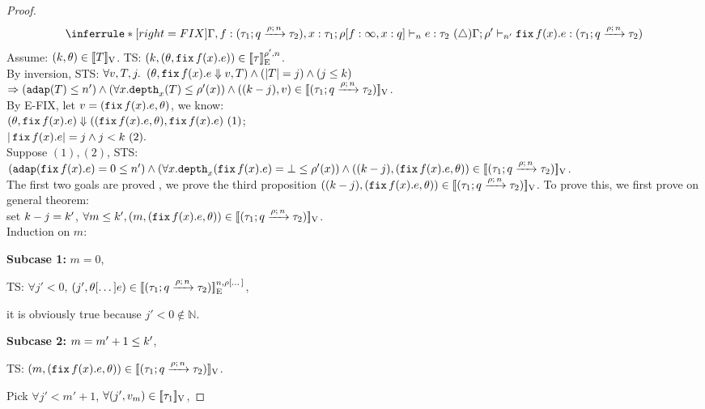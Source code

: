 \documentclass[a4paper,11pt]{article}
\theoremstyle{definition}
\begin{document}
\begin{proof}
\[
    \inferrule*[right = FIX]{
      \Gamma, f: (\tarr{\type_1}{\type_2}{\nnatbiA}{\dmap}{\nnatA}), x: \type_1;
      \dmap[f: \infty, x: \nnatbiA]
      \tvdash{\nnatA}
      \expr: \type_2
       ~ (\triangle)
    }{
      \Gamma; \dmap' \tvdash{\nnatA'} \efix f(x).\expr: (\tarr{\type_1}{\type_2}{\nnatbiA}{\dmap}{\nnatA})
    }
\]
Assume: $(\stepiA, \env) \in \lrv{\tr}$. TS: $(\stepiA, (\env, \efix f(x). \expr)) \in \lre{\dmap'}{\nnatA}{\type}$.\\
%
By inversion, STS: $\forall \valr, \tr, j.$
$(\env, \efix f(x). \expr \bigstep \valr, \tr) \land (\size{\tr} = j) \land (j \leq \stepiA)$
$ \Rightarrow (\adap(\tr) \leq \nnatA') \land (\forall x. \ddep{x}(\tr) \leq \dmap'(x)) \land ((\stepiA - j), \valr) \in \lrv{(\tarr{\type_1}{\type_2}{\nnatbiA}{\dmap}{\nnatA})}$.\\
%
By E-FIX, let $\valr = (\efix f(x). \expr, \env)$, we know:\\
$(\env, \efix f(x). \expr) \bigstep ((\efix f(x). \expr, \env), \efix f(x). \expr)~(1) $;\\
$|\efix f(x). \expr|= j \land j < \stepiA ~(2).$\\
%
Suppose $(1), (2)$, STS: $ (\adap(\efix f(x). \expr) = 0 \leq \nnatA') \land (\forall x. \ddep{x}(\efix f(x). \expr) = \bot \leq \dmap'(x)) \land ((\stepiA -j), (\efix f(x). \expr, \env)) \in \lrv{(\tarr{\type_1}{\type_2}{\nnatbiA}{\dmap}{\nnatA})}$.\\
%
The first two goals are proved , we prove the third proposition
$((\stepiA -j), (\efix f(x). \expr, \env)) \in
\lrv{(\tarr{\type_1}{\type_2}{\nnatbiA}{\dmap}{\nnatA})}$. To prove
this,  we first prove on general theorem: \\
set $\stepiA - j = \stepiA'$, $\forall m \leq \stepiA', (m, (\efix f(x). \expr, \env)) \in \lrv{(\tarr{\type_1}{\type_2}{\nnatbiA}{\dmap}{\nnatA})}$.\\
%
Induction on $m$:

{\bf Subcase 1:} $m = 0$,

	TS: $\forall j' < 0$, $(j', \env[\dots] \expr) \in \lre{\nnatA}{\dmap[\dots]}{(\tarr{\type_1}{\type_2}{\nnatbiA}{\dmap}{\nnatA})}$,
	
	it is obviously true because $j' < 0 \notin \mathbb{N}$.

{\bf Subcase 2:} $m = m' + 1 \leq \stepiA'$, 

	TS: $ (m, (\efix f(x). \expr, \env)) \in \lrv{(\tarr{\type_1}{\type_2}{\nnatbiA}{\dmap}{\nnatA})}$.

	Pick $\forall j' < m' + 1$, $\forall (j', \valr_m) \in \lrv{\type_1}$,
	

\end{proof}
\end{document}
